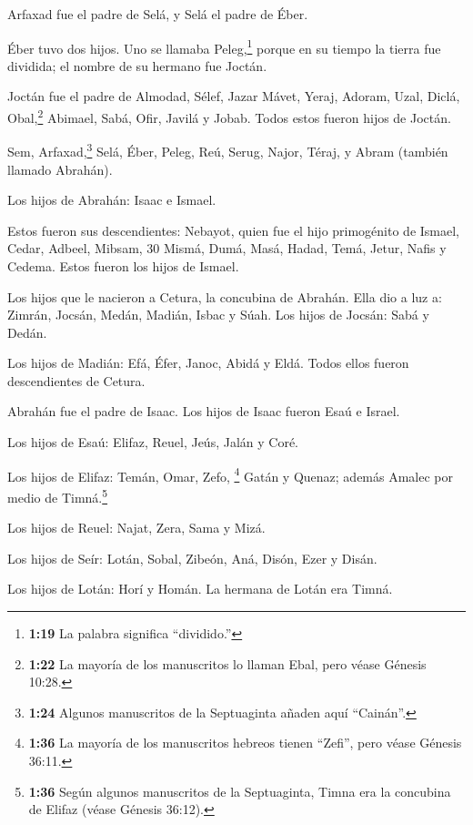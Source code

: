  Arfaxad fue el padre de Selá, y Selá el padre de Éber.

 Éber tuvo dos hijos. Uno se llamaba Peleg,\footnote{\textbf{1:19}
  La palabra significa ``dividido.''} porque en su tiempo la tierra fue
dividida; el nombre de su hermano fue Joctán.

 Joctán fue el padre de Almodad, Sélef, Jazar Mávet, Yeraj,
 Adoram, Uzal, Diclá,  Obal,\footnote{\textbf{1:22}
  La mayoría de los manuscritos lo llaman Ebal, pero véase Génesis
  10:28.} Abimael, Sabá,  Ofir, Javilá y Jobab. Todos estos
fueron hijos de Joctán.

 Sem, Arfaxad,\footnote{\textbf{1:24} Algunos manuscritos
  de la Septuaginta añaden aquí ``Cainán''.} Selá,  Éber,
Peleg, Reú,  Serug, Najor, Téraj,  y Abram
(también llamado Abrahán).

 Los hijos de Abrahán: Isaac e Ismael.

 Estos fueron sus descendientes: Nebayot, quien fue el hijo
primogénito de Ismael, Cedar, Adbeel, Mibsam, 30 Mismá, Dumá, Masá,
Hadad, Temá,  Jetur, Nafis y Cedema. Estos fueron los hijos
de Ismael.

 Los hijos que le nacieron a Cetura, la concubina de
Abrahán. Ella dio a luz a: Zimrán, Jocsán, Medán, Madián, Isbac y Súah.
Los hijos de Jocsán: Sabá y Dedán.

 Los hijos de Madián: Efá, Éfer, Janoc, Abidá y Eldá. Todos
ellos fueron descendientes de Cetura.

 Abrahán fue el padre de Isaac. Los hijos de Isaac fueron
Esaú e Israel.

 Los hijos de Esaú: Elifaz, Reuel, Jeús, Jalán y Coré.

 Los hijos de Elifaz: Temán, Omar, Zefo, \footnote{\textbf{1:36}
  La mayoría de los manuscritos hebreos tienen ``Zefi'', pero véase
  Génesis 36:11.} Gatán y Quenaz; además Amalec por medio de
Timná.\footnote{\textbf{1:36} Según algunos manuscritos de la
  Septuaginta, Timna era la concubina de Elifaz (véase Génesis 36:12).}

 Los hijos de Reuel: Najat, Zera, Sama y Mizá.

 Los hijos de Seír: Lotán, Sobal, Zibeón, Aná, Disón, Ezer
y Disán.

 Los hijos de Lotán: Horí y Homán. La hermana de Lotán era
Timná.


